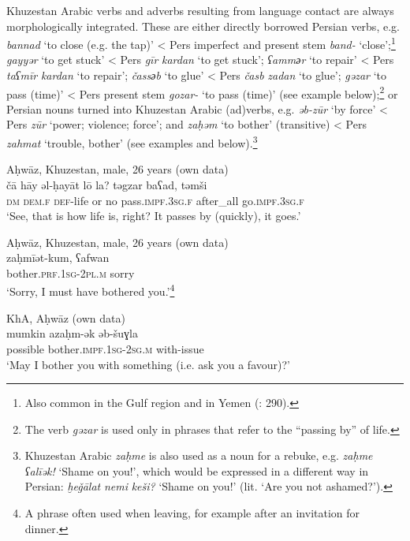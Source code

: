 \documentclass[output=paper,nonflat]{langsci/langscibook}
\begin{document}
Khuzestan Arabic verbs and adverbs resulting from language contact are always morphologically integrated. These are either directly borrowed Persian verbs, e.g. \textit{bannad} ‘to close (e.g. the tap)’ < Pers imperfect and present stem \textit{band-} ‘close’;\footnote{Also common in the Gulf region and in Yemen (\citealt{BehnstedtWoidich2014}: 290).} \textit{gayyər} ‘to get stuck’ <  Pers \textit{gīr} \textit{kardan} ‘to get stuck’; \textit{ʕamm{әr}} ‘to repair’ < Pers \textit{taʕmīr} \textit{kardan} ‘to repair’; \textit{čass{әb}} ‘to glue’ < Pers \textit{časb} \textit{zadan} ‘to glue’; \textit{gəzar} ‘to pass (time)’ < Pers present stem \textit{gozar-} ‘to pass (time)’ (see example  below);\footnote{The verb \textit{gəzar} is used only in phrases that refer to the “passing by” of life.} or Persian nouns turned into Khuzestan Arabic (ad)verbs, e.g. \textit{əb-zūr} ‘by force’ < Pers \textit{zūr} ‘power; violence; force’; and \textit{zaḥəm} ‘to bother’ (transitive) < Pers \textit{zahmat} ‘trouble, bother’ (see examples  and  below).\footnote{Khuzestan Arabic \textit{zaḥme} is also used as a noun for a rebuke, e.g. \textit{zaḥme} \textit{ʕalīək!} ‘Shame on you!’, which would be expressed in a different way in Persian: \textit{ḫeǧālat} \textit{nemi} \textit{keši?} ‘Shame on you!' (lit. ‘Are you not ashamed?’).}

\ea
{Aḥwāz, Khuzestan, male, 26 years (own data)}\\ \label{ca}
\gll čā hāy əl-ḥayāt lō la? təgzar baʕad, təmši\\
     \textsc{dm} \textsc{dem}.\textsc{f} \textsc{def}{}-life or no pass.\textsc{impf}.\textsc{3sg.f} after\_all go.\textsc{impf.3sg.f}\\
\glt ‘See, that is how life is, right? It passes by (quickly), it goes.’
\z

\ea \label{zah}
{Aḥwāz, Khuzestan, male, 26 years (own data)}\\
\gll zaḥmīət-kum, ʕafwan\\
     bother.\textsc{prf}.\textsc{1sg}{}-\textsc{2pl.m} sorry\\
\glt ‘Sorry, I must have bothered you.’\footnote{A phrase often used when leaving, for example after an invitation for dinner.}
\z

\ea \label{mumkin}
{KhA, Aḥwāz (own data)}\\
\gll mumkin azaḥm-ək əb-šuɣla\\
     possible bother.\textsc{impf}.\textsc{1sg}{}-\textsc{2sg.m} with-issue\\
\glt ‘May I bother you with something (i.e. ask you a favour)?’
\z
\end{document}
